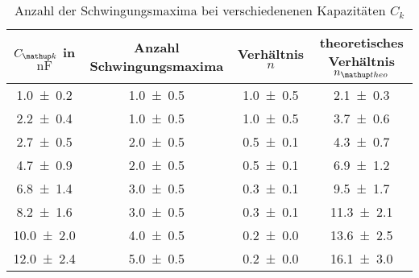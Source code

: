 \begin{table} 
\centering 
\caption{ Anzahl der Schwingungsmaxima bei verschiedenenen Kapazitäten $C_k$} 
\label{fig:teila_n_ck} 
\begin{tabular}{S S S S} 
\toprule  
{$C\ua{k}$ in $\si{\nano\farad}$} & {Anzahl Schwingungsmaxima} & {Verhältnis $n$} & {theoretisches Verhältnis $n\ua{theo}$}  \\ 
\midrule  
\num{1.0\pm0.2} & \num{1.0\pm0.5} & \num{1.0\pm0.5} & \num{2.1\pm0.3}\\ 
\num{2.2\pm0.4} & \num{1.0\pm0.5} & \num{1.0\pm0.5} & \num{3.7\pm0.6}\\ 
\num{2.7\pm0.5} & \num{2.0\pm0.5} & \num{0.5\pm0.1} & \num{4.3\pm0.7}\\ 
\num{4.7\pm0.9} & \num{2.0\pm0.5} & \num{0.5\pm0.1} & \num{6.9\pm1.2}\\ 
\num{6.8\pm1.4} & \num{3.0\pm0.5} & \num{0.3\pm0.1} & \num{9.5\pm1.7}\\ 
\num{8.2\pm1.6} & \num{3.0\pm0.5} & \num{0.3\pm0.1} & \num{11.3\pm2.1}\\ 
\num{10.0\pm2.0} & \num{4.0\pm0.5} & \num{0.2\pm0.0} & \num{13.6\pm2.5}\\ 
\num{12.0\pm2.4} & \num{5.0\pm0.5} & \num{0.2\pm0.0} & \num{16.1\pm3.0}\\ 
\bottomrule 
\end{tabular} 
\end{table}

